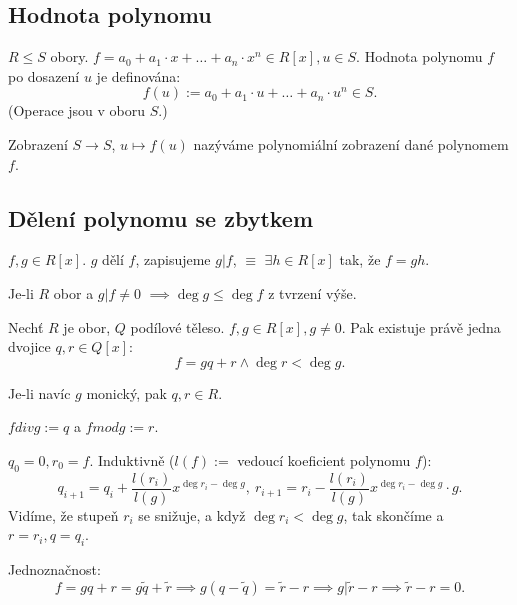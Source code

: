 \documentclass[12pt]{article}                   %
\begin{document}
    \subsection{Hodnota polynomu}
        \begin{definice}
            $R ≤ S$ obory. $f = a_0 + a_1·x + … + a_n·x^n \in R[x], u \in S$. Hodnota polynomu $f$ po dosazení $u$ je definována:
            $$ f(u):= a_0 + a_1·u + … + a_n·u^n \in S. $$
            (Operace jsou v oboru $S$.)

            Zobrazení $S \rightarrow S$, $u \mapsto f(u)$ nazýváme polynomiální zobrazení dané polynomem $f$.
        \end{definice}

    \subsection{Dělení polynomu se zbytkem}
        \begin{definice}
            $f, g \in R[x]$. $g$ dělí $f$, zapisujeme $g | f$, $≡$ $\exists h \in R[x]$ tak, že $f = gh$.

            Je-li $R$ obor a $g | f ≠ 0$ $\implies \deg g ≤ \deg f$ z tvrzení výše.
        \end{definice}

        \begin{tvrzeni}
            Nechť $R$ je obor, $Q$ podílové těleso. $f, g \in R[x], g≠0$. Pak existuje právě jedna dvojice $q, r \in Q[x]$:
            $$ f = gq + r \land \deg r < \deg g. $$

            Je-li navíc $g$ monický, pak $q, r \in R$.

            $f div g := q$ a $f mod g := r$.

            \begin{dukazin}
                    $q_0 = 0, r_0 = f$. Induktivně ($l(f) := $ vedoucí koeficient polynomu $f$):
                $$ q_{i+1} = q_i + \frac{l(r_i)}{l(g)} x^{\deg r_i - \deg g},\ r_{i+1} = r_i - \frac{l(r_i)}{l(g)}x^{\deg r_i - \deg g}·g. $$
                Vidíme, že stupeň $r_i$ se snižuje, a když $\deg r_i < \deg g$, tak skončíme a $r = r_i, q = q_i$.

                Jednoznačnost:
                $$ f = gq + r = g\tilde{q} + \tilde{r} \implies g(q - \tilde{q}) = \tilde{r} - r \implies g | \tilde{r} - r \implies \tilde{r} - r = 0. $$ 
            \end{dukazin}
        \end{tvrzeni}
\end{document}

